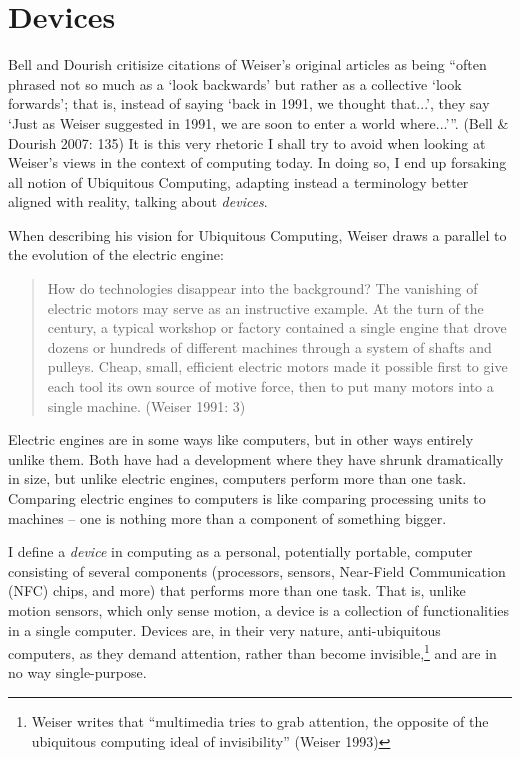 \section{Devices}
\label{sec:devices}

Bell and Dourish critisize citations of Weiser's original articles as being ``often phrased not so much as a `look backwards'
but rather as a collective `look forwards'; that is, instead of saying `back in 1991, we thought that...', they say `Just
as Weiser suggested in 1991, we are soon to enter a world where...'''. (Bell \& Dourish 2007: 135) It is this very rhetoric I shall try to avoid when looking
at Weiser's views in the context of computing today. In doing so, I end up forsaking all notion of Ubiquitous Computing, adapting
instead a terminology better aligned with reality, talking about \emph{devices}.

When describing his vision for Ubiquitous Computing, Weiser draws a parallel to the evolution of the electric engine:

\begin{quote}
    How do technologies disappear into the background? The vanishing of electric motors may serve as an instructive example.
    At the turn of the century, a typical workshop or factory contained a single engine that drove dozens or hundreds of
    different machines through a system of shafts and pulleys. Cheap, small, efficient electric motors made it possible first
    to give each tool its own source of motive force, then to put many motors into a single machine. (Weiser 1991: 3)
\end{quote}

Electric engines are in some ways like computers, but in other ways entirely unlike them. Both have had a development where
they have shrunk dramatically in size, but unlike electric engines, computers perform more than one task. Comparing electric
engines to computers is like comparing processing units to machines -- one is nothing more than a component of something bigger.

I define a \emph{device} in computing as a personal, potentially portable, computer consisting of several components (processors, sensors, Near-Field Communication (NFC) chips, and more) that performs more
than one task. That is, unlike motion sensors, which only sense motion, a device is a collection of functionalities in a single
computer. Devices are, in their very nature, anti-ubiquitous computers, as they demand attention, rather than become
invisible,\footnote{Weiser writes that ``multimedia tries to grab attention, the opposite of the ubiquitous computing ideal of
invisibility'' (Weiser 1993)} and are in no way single-purpose.

